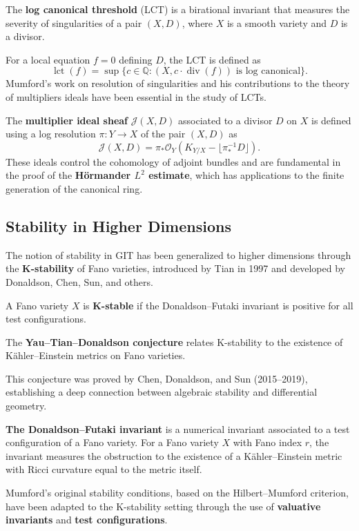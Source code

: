 The \textbf{log canonical threshold} (LCT) is a birational invariant that measures the severity of singularities of a pair $(X, D)$, where $X$ is a smooth variety and $D$ is a divisor.

For a local equation $f = 0$ defining $D$, the LCT is defined as
\[\operatorname{lct}(f) = \sup\{c \in \mathbb{Q} : (X, c \cdot \operatorname{div}(f)) \text{ is log canonical}\}.\]
Mumford's work on resolution of singularities and his contributions to the theory of multipliers ideals have been essential in the study of LCTs.

The \textbf{multiplier ideal sheaf} $\mathcal{J}(X, D)$ associated to a divisor $D$ on $X$ is defined using a log resolution $\pi: Y \to X$ of the pair $(X, D)$ as
\[\mathcal{J}(X, D) = \pi_* \mathcal{O}_Y(K_{Y/X} - \lfloor \pi^{-1}_* D \rfloor).\]
These ideals control the cohomology of adjoint bundles and are fundamental in the proof of the \textbf{Hörmander $L^2$ estimate}, which has applications to the finite generation of the canonical ring.

\subsection{Stability in Higher Dimensions}

The notion of stability in GIT has been generalized to higher dimensions through the \textbf{K-stability} of Fano varieties, introduced by Tian in 1997 and developed by Donaldson, Chen, Sun, and others.

A Fano variety $X$ is \textbf{K-stable} if the Donaldson--Futaki invariant is positive for all test configurations.

The \textbf{Yau--Tian--Donaldson conjecture} relates K-stability to the existence of Kähler--Einstein metrics on Fano varieties.

This conjecture was proved by Chen, Donaldson, and Sun (2015--2019), establishing a deep connection between algebraic stability and differential geometry.

\textbf{The Donaldson--Futaki invariant} is a numerical invariant associated to a test configuration of a Fano variety. For a Fano variety $X$ with Fano index $r$, the invariant measures the obstruction to the existence of a Kähler--Einstein metric with Ricci curvature equal to the metric itself.

Mumford's original stability conditions, based on the Hilbert--Mumford criterion, have been adapted to the K-stability setting through the use of \textbf{valuative invariants} and \textbf{test configurations}.

